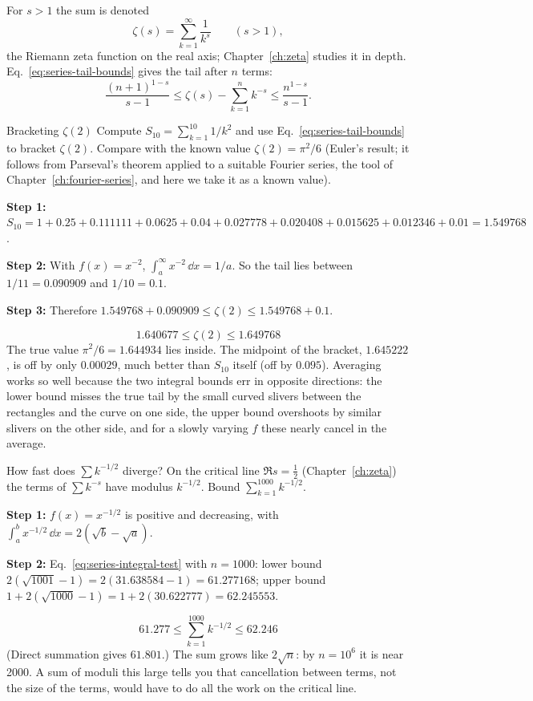 For $s>1$ the sum is denoted
\begin{equation}
\zeta(s)=\sum_{k=1}^\infty\frac1{k^{s}}\qquad(s>1),
\label{eq:series-pseries}
\end{equation}
the Riemann zeta function on the real axis; Chapter~\ref{ch:zeta} studies it in depth. Eq.~\eqref{eq:series-tail-bounds} gives the tail after $n$ terms:
\[
\frac{(n+1)^{1-s}}{s-1}\le\zeta(s)-\sum_{k=1}^nk^{-s}\le\frac{n^{1-s}}{s-1}.
\]

\begin{sample}{Bracketing $\zeta(2)$}
Compute $S_{10}=\sum_{k=1}^{10}1/k^2$ and use Eq.~\eqref{eq:series-tail-bounds} to bracket $\zeta(2)$. Compare with the known value $\zeta(2)=\pi^2/6$ (Euler's result; it follows from Parseval's theorem applied to a suitable Fourier series, the tool of Chapter~\ref{ch:fourier-series}, and here we take it as a known value).

\textbf{Step 1:} $S_{10}=1+0.25+0.111111+0.0625+0.04+0.027778+0.020408+0.015625+0.012346+0.01=1.549768$.

\textbf{Step 2:} With $f(x)=x^{-2}$, $\int_a^\infty x^{-2}\,\dd x=1/a$. So the tail lies between $1/11=0.090909$ and $1/10=0.1$.

\textbf{Step 3:} Therefore $1.549768+0.090909\le\zeta(2)\le1.549768+0.1$.

\[\boxed{1.640677\le\zeta(2)\le1.649768}\]
The true value $\pi^2/6=1.644934$ lies inside. The midpoint of the bracket, $1.645222$, is off by only $0.00029$, much better than $S_{10}$ itself (off by $0.095$). Averaging works so well because the two integral bounds err in opposite directions: the lower bound misses the true tail by the small curved slivers between the rectangles and the curve on one side, the upper bound overshoots by similar slivers on the other side, and for a slowly varying $f$ these nearly cancel in the average.
\end{sample}

\begin{sample}{How fast does $\sum k^{-1/2}$ diverge?}
On the critical line $\Re s=\tfrac12$ (Chapter~\ref{ch:zeta}) the terms of $\sum k^{-s}$ have modulus $k^{-1/2}$. Bound $\sum_{k=1}^{1000}k^{-1/2}$.

\textbf{Step 1:} $f(x)=x^{-1/2}$ is positive and decreasing, with $\int_a^bx^{-1/2}\,\dd x=2(\sqrt b-\sqrt a)$.

\textbf{Step 2:} Eq.~\eqref{eq:series-integral-test} with $n=1000$: lower bound $2(\sqrt{1001}-1)=2(31.638584-1)=61.277168$; upper bound $1+2(\sqrt{1000}-1)=1+2(30.622777)=62.245553$.

\[\boxed{61.277\le\sum_{k=1}^{1000}k^{-1/2}\le62.246}\]
(Direct summation gives $61.801$.) The sum grows like $2\sqrt n$: by $n=10^6$ it is near 2000. A sum of moduli this large tells you that cancellation between terms, not the size of the terms, would have to do all the work on the critical line.
\end{sample}


